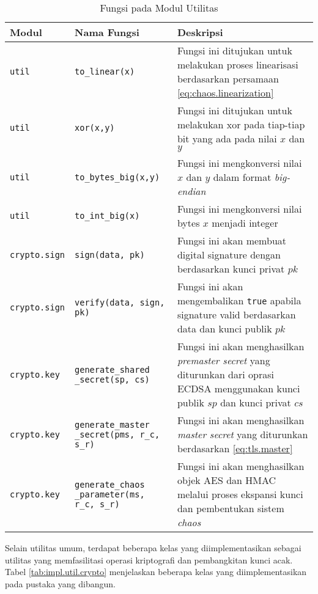 \begin{table}[!h]
  \centering
  \caption{Fungsi pada Modul Utilitas} \label{tab:impl.util}
  \begin{tabular}{|p{2.5cm}|p{3.5cm}|p{8cm}|}
    \hline
    Modul & Nama Fungsi & Deskripsi \\ \hline
    \texttt{util} & \texttt{to\_linear(x)} & Fungsi ini ditujukan untuk melakukan proses linearisasi berdasarkan persamaan \ref{eq:chaos.linearization} \\ \hline
    \texttt{util} & \texttt{xor(x,y)} & Fungsi ini ditujukan untuk melakukan xor pada tiap-tiap bit yang ada pada nilai $x$ dan $y$ \\ \hline
    \texttt{util} & \texttt{to\_bytes\_big(x,y)} & Fungsi ini mengkonversi nilai $x$ dan $y$ dalam format \emph{big-endian} \\ \hline
    \texttt{util} & \texttt{to\_int\_big(x)} & Fungsi ini mengkonversi nilai bytes $x$ menjadi integer\\ \hline
    \texttt{crypto.sign} & \texttt{sign(data, pk)} & Fungsi ini akan membuat digital signature dengan berdasarkan kunci privat $pk$\\ \hline
    \texttt{crypto.sign} & \texttt{verify(data, sign, pk)} & Fungsi ini akan mengembalikan \texttt{true} apabila signature valid berdasarkan data dan kunci publik $pk$\\ \hline
    \texttt{crypto.key} & \texttt{generate\_shared} \texttt{\_secret(sp, cs)} & Fungsi ini akan menghasilkan \emph{premaster secret} yang diturunkan dari oprasi ECDSA menggunakan kunci publik $sp$ dan kunci privat $cs$\\ \hline
    \texttt{crypto.key} & \texttt{generate\_master} \texttt{\_secret(pms, r\_c, s\_r)} & Fungsi ini akan menghasilkan \emph{master secret} yang diturunkan berdasarkan \ref{eq:tls.master}\\ \hline
    \texttt{crypto.key} & \texttt{generate\_chaos} \texttt{\_parameter(ms, r\_c, s\_r)} & Fungsi ini akan menghasilkan objek AES dan HMAC melalui proses ekspansi kunci dan pembentukan sistem \emph{chaos}\\ \hline
  \end{tabular}
\end{table}

Selain utilitas umum, terdapat beberapa kelas yang diimplementasikan sebagai utilitas yang memfasilitasi operasi kriptografi dan pembangkitan kunci acak. Tabel \ref{tab:impl.util.crypto} menjelaskan beberapa kelas yang diimplementasikan pada pustaka yang dibangun.

